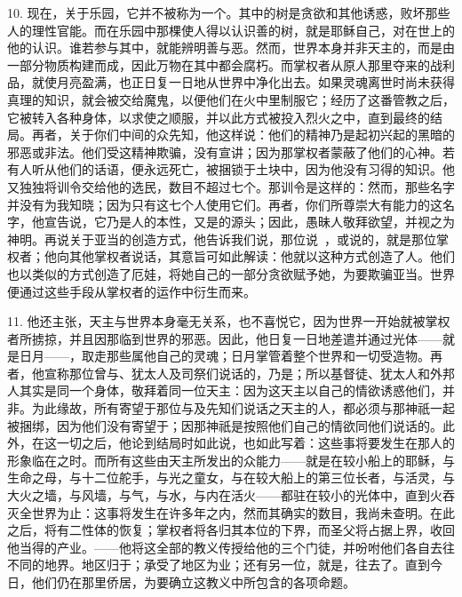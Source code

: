 10. 现在，关于乐园，它并不被称为一个。其中的树是贪欲和其他诱惑，败坏那些人的理性官能。而在乐园中那棵使人得以认识善的树，就是耶稣自己，对在世上的他的认识。谁若参与其中，就能辨明善与恶。然而，世界本身并非天主的，而是由一部分物质构建而成，因此万物在其中都会腐朽。而掌权者从原人那里夺来的战利品，就使月亮盈满，也正日复一日地从世界中净化出去。如果灵魂离世时尚未获得真理的知识，就会被交给魔鬼，以便他们在火中里制服它；经历了这番管教之后，它被转入各种身体，以求使之顺服，并以此方式被投入烈火之中，直到最终的结局。再者，关于你们中间的众先知，他这样说：他们的精神乃是起初兴起的黑暗的邪恶或非法。他们受这精神欺骗，没有宣讲；因为那掌权者蒙蔽了他们的心神。若有人听从他们的话语，便永远死亡，被捆锁于土块中，因为他没有习得的知识。他又独独将训令交给他的选民，数目不超过七个。那训令是这样的：然而，那些名字并没有为我知晓；因为只有这七个人使用它们。再者，你们所尊崇大有能力的这名字，他宣告说，它乃是人的本性，又是的源头；因此，愚昧人敬拜欲望，并视之为神明。再说关于亚当的创造方式，他告诉我们说，那位说~，或说的，就是那位掌权者；他向其他掌权者说话，其意旨可如此解读：他就以这种方式创造了人。他们也以类似的方式创造了厄娃，将她自己的一部分贪欲赋予她，为要欺骗亚当。世界便通过这些手段从掌权者的运作中衍生而来。\par

11. 他还主张，天主与世界本身毫无关系，也不喜悦它，因为世界一开始就被掌权者所掳掠，并且因那临到世界的邪恶。因此，他日复一日地差遣并通过光体——就是日月——，取走那些属他自己的灵魂；日月掌管着整个世界和一切受造物。再者，他宣称那位曾与、犹太人及司祭们说话的，乃是；所以基督徒、犹太人和外邦人其实是同一个身体，敬拜着同一位天主：因为这天主以自己的情欲诱惑他们，并非。为此缘故，所有寄望于那位与及先知们说话之天主的人，都必须与那神祇一起被捆绑，因为他们没有寄望于；因那神祇是按照他们自己的情欲同他们说话的。此外，在这一切之后，他论到结局时如此说，也如此写着：这些事将要发生在那人的形象临在之时。而所有这些由天主所发出的众能力——就是在较小船上的耶稣，与生命之母，与十二位舵手，与光之童女，与在较大船上的第三位长者，与活灵，与大火之墙，与风墙，与气，与水，与内在活火——都驻在较小的光体中，直到火吞灭全世界为止：这事将发生在许多年之内，然而其确实的数目，我尚未查明。在此之后，将有二性体的恢复；掌权者将各归其本位的下界，而圣父将占据上界，收回他当得的产业。——他将这全部的教义传授给他的三个门徒，并吩咐他们各自去往不同的地界。地区归于；承受了地区为业；还有另一位，就是，往去了。直到今日，他们仍在那里侨居，为要确立这教义中所包含的各项命题。\par

